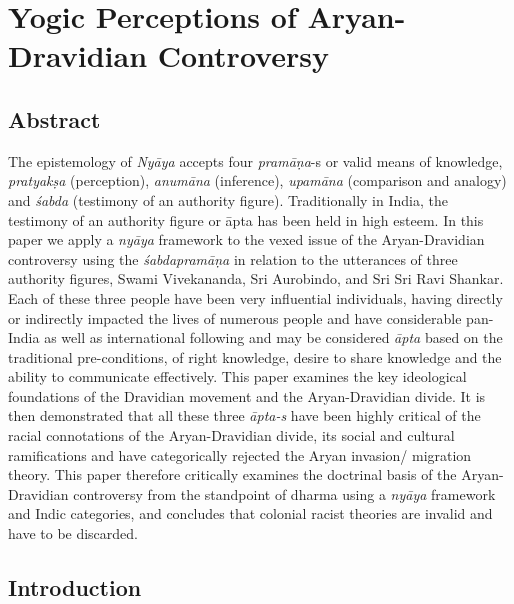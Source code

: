 
\chapter{Yogic Perceptions of Aryan-Dravidian Controversy}\label{chap09}



\section*{Abstract}

The epistemology of \textit{Nyāya} accepts four \textit{pramāṇa}-s or valid means of knowledge, \textit{pratyakṣa} (perception), \textit{anumāna} (inference), \textit{upamāna} (comparison and analogy) and \textit{śabda} (testimony of an authority figure). Traditionally in India, the testimony of an authority figure or āpta has been held in high esteem. In this paper we apply a \textit{nyāya} framework to the vexed issue of the Aryan-Dravidian controversy using the \textit{śabdapramāṇa} in relation to the utterances of three authority figures, Swami Vivekananda, Sri Aurobindo, and Sri Sri Ravi Shankar. Each of these three people have been very influential individuals, having directly or indirectly impacted the lives of numerous people and have considerable pan-India as well as international following and may be considered\textit{ āpta} based on the traditional pre-conditions, of right knowledge, desire to share knowledge and the ability to communicate effectively. This paper examines the key ideological foundations of the Dravidian movement and the Aryan-Dravidian divide. It is then demonstrated that all these three \textit{āpta-s} have been highly critical of the racial connotations of the Aryan-Dravidian divide, its social and cultural ramifications and have categorically rejected the Aryan invasion/ migration theory. This paper therefore critically examines the doctrinal basis of the Aryan-Dravidian controversy from the standpoint of dharma using a \textit{nyāya} framework and Indic categories, and concludes that colonial racist theories are invalid and have to be discarded.


\section*{Introduction}


